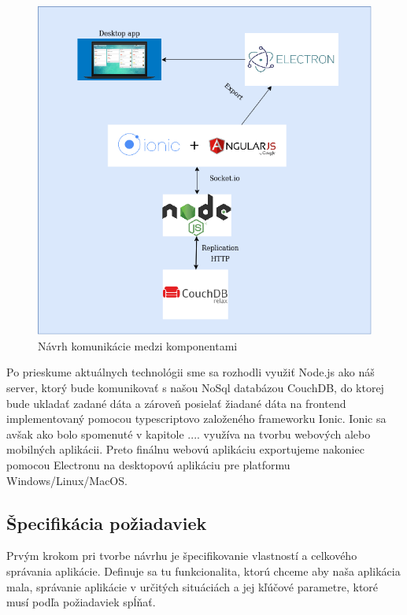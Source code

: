 \begin{figure}[H]
    \centering
    \includegraphics[scale=0.60]{img/diagram.png}
    \caption{Návrh komunikácie medzi komponentami}
    \label{fig:diagram}
\end{figure}

\indent Po prieskume aktuálnych technológii sme sa rozhodli využiť Node.js ako náš server, ktorý bude komunikovať s našou NoSql databázou CouchDB, do ktorej bude ukladať zadané dáta a zároveň posielať žiadané dáta na frontend implementovaný pomocou typescriptovo založeného frameworku Ionic. Ionic sa avšak ako bolo spomenuté v kapitole .... využíva na tvorbu webových alebo mobilných aplikácii. Preto finálnu webovú aplikáciu exportujeme nakoniec pomocou Electronu na desktopovú aplikáciu pre platformu Windows/Linux/MacOS.

\subsection{Špecifikácia požiadaviek}
\indent Prvým krokom pri tvorbe návrhu je špecifikovanie vlastností a celkového správania aplikácie. Definuje sa tu funkcionalita, ktorú chceme aby naša aplikácia mala, správanie aplikácie v určitých situáciách a jej kľúčové parametre, ktoré musí podľa požiadaviek spĺňať.
